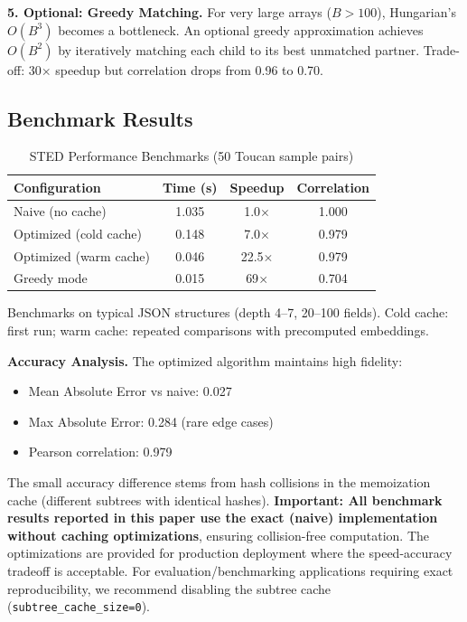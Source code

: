 \documentclass{article}
\theoremstyle{plain}
\theoremstyle{definition}
\begin{document}
\textbf{5. Optional: Greedy Matching.} For very large arrays ($B>100$), Hungarian's $O(B^3)$ becomes a bottleneck. An optional greedy approximation achieves $O(B^2)$ by iteratively matching each child to its best unmatched partner. Trade-off: 30$\times$ speedup but correlation drops from 0.96 to 0.70.

\subsection{Benchmark Results}

\begin{table}[h]
\centering
\caption{STED Performance Benchmarks (50 Toucan sample pairs)}
\label{tab:optimization-benchmarks}
\scriptsize
\begin{tabular}{@{}lccc@{}}
\toprule
\textbf{Configuration} & \textbf{Time (s)} & \textbf{Speedup} & \textbf{Correlation} \\
\midrule
Naive (no cache) & 1.035 & 1.0$\times$ & 1.000 \\
Optimized (cold cache) & 0.148 & 7.0$\times$ & 0.979 \\
Optimized (warm cache) & 0.046 & 22.5$\times$ & 0.979 \\
Greedy mode & 0.015 & 69$\times$ & 0.704 \\
\bottomrule
\end{tabular}

\vspace{0.3em}
\raggedright\small Benchmarks on typical JSON structures (depth 4--7, 20--100 fields). Cold cache: first run; warm cache: repeated comparisons with precomputed embeddings.
\end{table}

\textbf{Accuracy Analysis.} The optimized algorithm maintains high fidelity:
\begin{itemize}
\item Mean Absolute Error vs naive: 0.027
\item Max Absolute Error: 0.284 (rare edge cases)
\item Pearson correlation: 0.979
\end{itemize}

The small accuracy difference stems from hash collisions in the memoization cache (different subtrees with identical hashes). \textbf{Important: All benchmark results reported in this paper use the exact (naive) implementation without caching optimizations}, ensuring collision-free computation. The optimizations are provided for production deployment where the speed-accuracy tradeoff is acceptable. For evaluation/benchmarking applications requiring exact reproducibility, we recommend disabling the subtree cache (\texttt{subtree\_cache\_size=0}).
\end{document}
